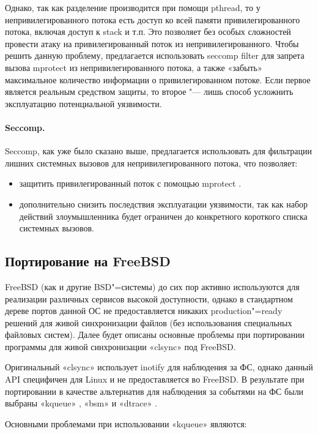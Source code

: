 \documentclass[10pt, a5paper]{article}
\begin{document}
Однако, так как разделение производится при помощи pthread, то у непривилегированного потока есть доступ ко всей памяти привилегированного потока, включая доступ к stack и т.п. Это позволяет без особых сложностей провести атаку на привилегированный поток из непривилегированного. Чтобы решить данную проблему, предлагается использовать seccomp filter для запрета вызова mprotect из непривилегированного потока, а также «забыть» максимальное количество информации о привилегированном потоке. Если первое является реальным средством защиты, то второе "--- лишь способ усложнить эксплуатацию потенциальной уязвимости.

\paragraph{Seccomp.}

Seccomp, как уже было сказано выше, предлагается использовать для фильтрации лишних системных вызовов для непривилегированного потока, что позволяет:

\begin{itemize}
  \item защитить привилегированный поток с помощью mprotect \cite{Okunev11}.
  \item дополнительно снизить последствия эксплуатации уязвимости, так как набор действий злоумышленника будет ограничен до конкретного короткого списка системных вызовов.
\end{itemize}

\subsection*{Портирование на FreeBSD}

FreeBSD (как и другие BSD"=системы) до сих пор активно используются для реализации различных сервисов высокой доступности, однако в стандартном дереве портов данной ОС не предоставляется никаких production"=ready решений для живой синхронизации файлов (без использования специальных файловых систем). Далее будет описаны основные проблемы при портировании программы для живой синхронизации «clsync» под FreeBSD.

Оригинальный «clsync» использует inotify для наблюдения за ФС, однако данный API специфичен для Linux и не предоставляется во FreeBSD. В результате при портировании в качестве альтернатив для наблюдения за событями на ФС были выбраны «kqueue» \cite{Okunev12}, «bsm» \cite{Okunev13} и «dtrace» \cite{Okunev14}.

Основными проблемами при использовании «kqueue» являются:
\end{document}
